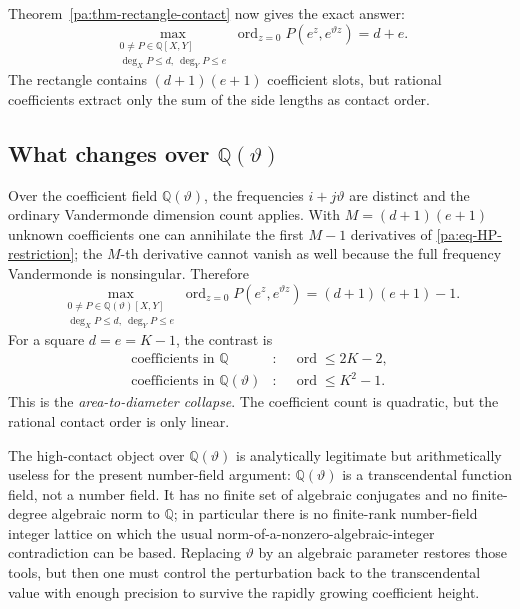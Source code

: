 \documentclass[11pt,oneside]{article}
\theoremstyle{definition}
\theoremstyle{remark}
\newcommand{\Q}{\mathbb Q}
\newcommand{\thetaq}{\vartheta}
\begin{document}
Theorem~\ref{pa:thm-rectangle-contact} now gives the exact answer:
\begin{equation}
 \max_{\substack{0\ne P\in\Q[X,Y]\\ \deg_XP\le d,\ \deg_YP\le e}}
 \operatorname{ord}_{z=0}P(e^z,e^{\thetaq z})
 =d+e.
 \label{pa:eq-rational-HP-max}
\end{equation}
The rectangle contains \((d+1)(e+1)\) coefficient slots, but rational coefficients extract
only the sum of the side lengths as contact order.

\subsection{What changes over \texorpdfstring{\(\Q(\thetaq)\)}{Q(theta)}}

Over the coefficient field \(\Q(\thetaq)\), the frequencies
\(i+j\thetaq\) are distinct and the ordinary Vandermonde dimension count applies.  With
\(M=(d+1)(e+1)\) unknown coefficients one can annihilate the first \(M-1\) derivatives of
\eqref{pa:eq-HP-restriction}; the \(M\)-th derivative cannot vanish as well because the full
frequency Vandermonde is nonsingular.  Therefore
\begin{equation}
 \max_{\substack{0\ne P\in\Q(\thetaq)[X,Y]\\ \deg_XP\le d,\ \deg_YP\le e}}
 \operatorname{ord}_{z=0}P(e^z,e^{\thetaq z})
 =(d+1)(e+1)-1.
 \label{pa:eq-theta-field-HP-max}
\end{equation}
For a square \(d=e=K-1\), the contrast is
\begin{equation}
 \boxed{
 \begin{aligned}
  \text{coefficients in }\Q &: \quad \operatorname{ord}\le2K-2,\\
  \text{coefficients in }\Q(\thetaq) &: \quad \operatorname{ord}\le K^2-1.
 \end{aligned}}
 \label{pa:eq-area-diameter-box}
\end{equation}
This is the \emph{area-to-diameter collapse}.  The coefficient count is quadratic, but the
rational contact order is only linear.

The high-contact object over \(\Q(\thetaq)\) is analytically legitimate but arithmetically
useless for the present number-field argument: \(\Q(\thetaq)\) is a transcendental function
field, not a number field.  It has no finite set of algebraic conjugates and no finite-degree
algebraic norm to \(\Q\); in particular there is no finite-rank number-field integer lattice on
which the usual norm-of-a-nonzero-algebraic-integer contradiction can be based.  Replacing
\(\thetaq\) by an algebraic parameter restores those tools, but then one must control the
perturbation back to the transcendental value with enough precision to survive the rapidly
growing coefficient height.
\end{document}
